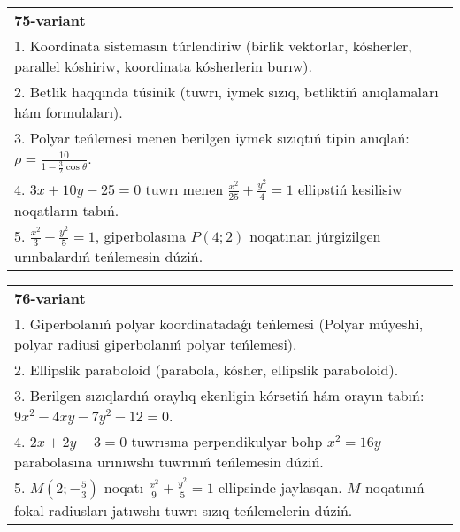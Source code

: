 \documentclass{article}
\begin{document}
\begin{tabular}{m{17cm}}
\textbf{75-variant}\\
1. Koordinata sistemasın túrlendiriw (birlik vektorlar, kósherler, parallel kóshiriw, koordinata kósherlerin burıw).\\

2. Betlik haqqında túsinik (tuwrı, iymek sızıq, betliktiń anıqlamaları hám formulaları).\\

3. Polyar teńlemesi menen berilgen iymek sızıqtıń tipin anıqlań: $\rho=\frac{10}{1-\frac{3}{2}\cos\theta}$.\\

4. $3x + 10y - 25 = 0$ tuwrı menen $\frac{x^{2}}{25} + \frac{y^{2}}{4} = 1$ ellipstiń kesilisiw noqatların tabıń.\\

5. $\frac{x^{2}}{3} - \frac{y^{2}}{5} = 1$, giperbolasına $P(4;2)$ noqatınan júrgizilgen urınbalardıń teńlemesin dúziń.  
\end{tabular}
\vspace{1cm}


\begin{tabular}{m{17cm}}
\textbf{76-variant}\\
1. Giperbolanıń polyar koordinatadaǵı teńlemesi (Polyar múyeshi, polyar radiusi giperbolanıń polyar teńlemesi).\\

2. Ellipslik paraboloid (parabola, kósher, ellipslik paraboloid).\\

3. Berilgen sızıqlardıń oraylıq ekenligin kórsetiń hám orayın tabıń: $9 x^{2}-4 xy-7 y^{2}-12=0$.\\

4. $2x + 2y - 3 = 0$ tuwrısına perpendikulyar bolıp $x^{2} = 16y$ parabolasına urınıwshı tuwrınıń teńlemesin dúziń.  \\

5. $M(2; - \frac{5}{3})$ noqatı $\frac{x^{2}}{9} + \frac{y^{2}}{5} = 1$ ellipsinde jaylasqan. $M$ noqatınıń fokal radiusları jatıwshı tuwrı sızıq teńlemelerin dúziń.  
\end{tabular}
\vspace{1cm}
\end{document}
